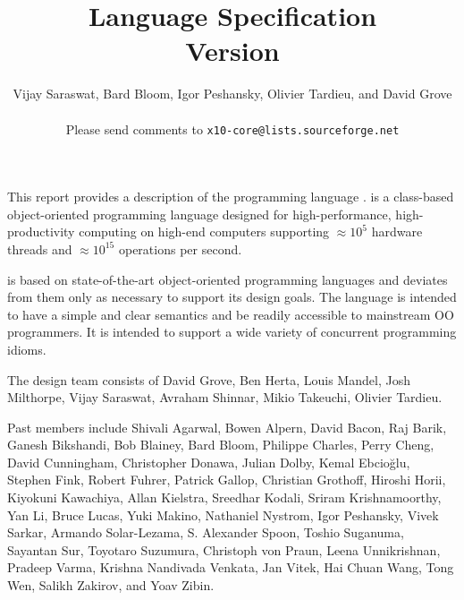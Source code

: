 
\thispagestyle{empty}


\title{ \Xten Language Specification \\
\large Version \integerversion}
\author{Vijay Saraswat, Bard Bloom, Igor Peshansky, Olivier Tardieu, and David Grove\\
\\
Please send comments to 
\texttt{x10-core@lists.sourceforge.net}}

\maketitle

\newcommand\authorsc[1]{#1}

This report provides a description of the programming
language \Xten. \Xten{} is a class-based object-oriented
programming language designed for high-performance, high-productivity
computing on high-end computers supporting $\approx 10^5$ hardware threads
and $\approx 10^{15}$ operations per second. 

\Xten{} is based on state-of-the-art object-oriented programming
languages and deviates from them only as necessary to support its
design goals. The language is intended to have a simple and clear
semantics and be readily accessible to mainstream OO programmers. It
is intended to support a wide variety of concurrent programming
idioms.


The \Xten{} design team consists of
\authorsc{David Grove},
\authorsc{Ben Herta},
\authorsc{Louis Mandel},
\authorsc{Josh Milthorpe},
\authorsc{Vijay Saraswat},
\authorsc{Avraham Shinnar},
\authorsc{Mikio Takeuchi},
\authorsc{Olivier Tardieu}.

Past members include
\authorsc{Shivali Agarwal}, 
\authorsc{Bowen Alpern}, 
\authorsc{David Bacon}, 
\authorsc{Raj Barik}, 
\authorsc{Ganesh Bikshandi}, 
\authorsc{Bob Blainey}, 
\authorsc{Bard Bloom}, 
\authorsc{Philippe Charles}, 
\authorsc{Perry Cheng}, 
\authorsc{David Cunningham},
\authorsc{Christopher Donawa}, 
\authorsc{Julian Dolby}, 
\authorsc{Kemal Ebcio\u{g}lu},
\authorsc{Stephen Fink},
\authorsc{Robert Fuhrer},
\authorsc{Patrick Gallop}, 
\authorsc{Christian Grothoff}, 
\authorsc{Hiroshi Horii}, 
\authorsc{Kiyokuni Kawachiya}, 
\authorsc{Allan Kielstra}, 
\authorsc{Sreedhar Kodali}, 
\authorsc{Sriram Krishnamoorthy}, 
\authorsc{Yan Li}, 
\authorsc{Bruce Lucas},
\authorsc{Yuki Makino}, 
\authorsc{Nathaniel Nystrom},
\authorsc{Igor Peshansky}, 
\authorsc{Vivek Sarkar},
\authorsc{Armando Solar-Lezama},  
\authorsc{S. Alexander Spoon}, 
\authorsc{Toshio Suganuma}, 
\authorsc{Sayantan Sur}, 
\authorsc{Toyotaro Suzumura}, 
\authorsc{Christoph von Praun},
\authorsc{Leena Unnikrishnan},
\authorsc{Pradeep Varma}, 
\authorsc{Krishna Nandivada Venkata},
\authorsc{Jan Vitek}, 
\authorsc{Hai Chuan Wang}, 
\authorsc{Tong Wen}, 
\authorsc{Salikh Zakirov}, and
\authorsc{Yoav Zibin}.


